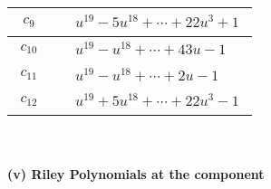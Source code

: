 \documentclass[1p]{elsarticle_modified}
\theoremstyle{definition}
\begin{document}
\begin{tabular}{m{50pt}|m{274pt}}
\hline $$\begin{aligned}c_{9}\end{aligned}$$&$\begin{aligned}
&u^{19}-5 u^{18}+\cdots+22 u^3+1
\end{aligned}$\\
\hline $$\begin{aligned}c_{10}\end{aligned}$$&$\begin{aligned}
&u^{19}- u^{18}+\cdots+43 u-1
\end{aligned}$\\
\hline $$\begin{aligned}c_{11}\end{aligned}$$&$\begin{aligned}
&u^{19}- u^{18}+\cdots+2 u-1
\end{aligned}$\\
\hline $$\begin{aligned}c_{12}\end{aligned}$$&$\begin{aligned}
&u^{19}+5 u^{18}+\cdots+22 u^3-1
\end{aligned}$\\
\hline
\end{tabular}\\~\\
\newpage\renewcommand{\arraystretch}{1}
\flushleft \textbf{(v) Riley Polynomials at the component}\newline \\
\end{document}
